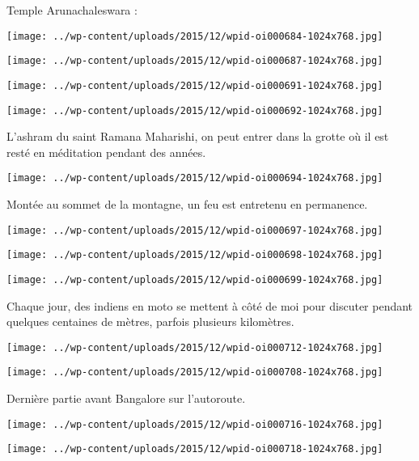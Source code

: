 Temple Arunachaleswara : 
\begin{center} \texttt{[image: ../wp-content/uploads/2015/12/wpid-oi000684-1024x768.jpg]} \end{center}
\begin{center} \texttt{[image: ../wp-content/uploads/2015/12/wpid-oi000687-1024x768.jpg]} \end{center}
\begin{center} \texttt{[image: ../wp-content/uploads/2015/12/wpid-oi000691-1024x768.jpg]} \end{center}
\begin{center} \texttt{[image: ../wp-content/uploads/2015/12/wpid-oi000692-1024x768.jpg]} \end{center}

L'ashram du saint Ramana Maharishi, on peut entrer dans la grotte où il est resté en méditation pendant des années. 
\begin{center} \texttt{[image: ../wp-content/uploads/2015/12/wpid-oi000694-1024x768.jpg]} \end{center}
\pagebreak

Montée au sommet de la montagne, un feu est entretenu en permanence. 
\begin{center} \texttt{[image: ../wp-content/uploads/2015/12/wpid-oi000697-1024x768.jpg]} \end{center}
\begin{center} \texttt{[image: ../wp-content/uploads/2015/12/wpid-oi000698-1024x768.jpg]} \end{center}
\begin{center} \texttt{[image: ../wp-content/uploads/2015/12/wpid-oi000699-1024x768.jpg]} \end{center}

Chaque jour, des indiens en moto se mettent à côté de moi pour discuter pendant quelques centaines de mètres, parfois plusieurs kilomètres. 
\begin{center} \texttt{[image: ../wp-content/uploads/2015/12/wpid-oi000712-1024x768.jpg]} \end{center}
\begin{center} \texttt{[image: ../wp-content/uploads/2015/12/wpid-oi000708-1024x768.jpg]} \end{center}

Dernière partie avant Bangalore sur l'autoroute. 
\begin{center} \texttt{[image: ../wp-content/uploads/2015/12/wpid-oi000716-1024x768.jpg]} \end{center}
\begin{center} \texttt{[image: ../wp-content/uploads/2015/12/wpid-oi000718-1024x768.jpg]} \end{center}

